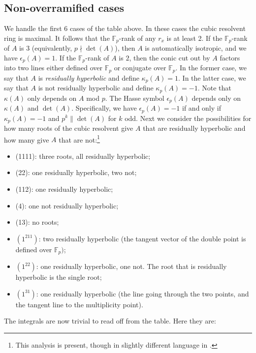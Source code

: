 \documentclass{article}
\def\F{{\mathbb F}}
\def\F{{\mathbb F}}
\begin{document}
\subsection{Non-overramified cases}

We handle the first 6 cases of the table above. In these cases the cubic resolvent ring is maximal. It follows that the $\F_p$-rank of any $r_x$ is at least 2.  If the $\F_p$-rank of $A$ is $3$ (equivalently, $p\nmid\det(A)$), then $A$ is automatically isotropic, and we have $\epsilon_p(A)=1$. If the $\F_p$-rank of $A$ is $2$, then the conic cut out by $A$ factors into two lines either defined over $\F_p$ or conjugate over $\F_p$. In the former case, we say that $A$ is {\it residually hyperbolic} and define $\kappa_p(A)=1$. In the latter case, we say that $A$ is not residually hyperbolic and define $\kappa_p(A)=-1$. Note that $\kappa(A)$ only depends on $A$ mod $p$. The Hasse symbol $\epsilon_p(A)$ depends only on $\kappa(A)$ and $\det(A)$. Specifically, we have $\epsilon_p(A)=-1$ if and only if $\kappa_p(A)=-1$ and $p^k\parallel\det(A)$ for $k$ odd.
Next we consider the possibilities for how many roots of the cubic resolvent give $A$ that are residually hyperbolic and how many give $A$ that are not:\footnote{This analysis is present, though in slightly different language in \cite{BSHMC}.}
\begin{itemize}
    \item (1111): three roots, all residually hyperbolic;
    \item (22): one residually hyperbolic, two not;
    \item (112): one residually hyperbolic;
    \item (4): one not residually hyperbolic;
    \item (13): no roots;
    \item $(1^211)$: two residually hyperbolic (the tangent vector of the double point is defined over $\F_p)$;
    \item $(1^22)$: one residually hyperbolic, one not. The root that is residually hyperbolic is the single root;
    \item $(1^31)$: one residually hyperbolic (the line going through the two points, and the tangent line to the multiplicity point).
\end{itemize}

The integrals are now trivial to read off from the table. Here they are:
\end{document}
